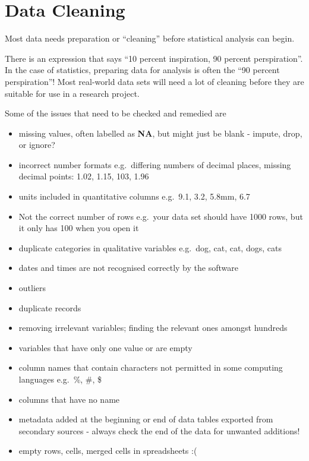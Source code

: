 \documentclass[
]{book}
\providecommand{\tightlist}{%
  \setlength{\itemsep}{0pt}\setlength{\parskip}{0pt}}
\begin{document}
\section{Data Cleaning}\label{data-cleaning}

Most data needs preparation or ``cleaning'' before statistical analysis can begin.

There is an expression that says ``10 percent inspiration, 90 percent perspiration''. In the case of statistics, preparing data for analysis is often the ``90 percent perspiration''! Most real-world data sets will need a lot of cleaning before they are suitable for use in a research project.

Some of the issues that need to be checked and remedied are

\begin{itemize}
\tightlist
\item
  missing values, often labelled as \textbf{NA}, but might just be blank - impute, drop, or ignore?
\item
  incorrect number formats e.g.~differing numbers of decimal places, missing decimal points: 1.02, 1.15, 103, 1.96
\item
  units included in quantitative columns e.g.~9.1, 3.2, 5.8mm, 6.7
\item
  Not the correct number of rows e.g.~your data set should have 1000 rows, but it only has 100 when you open it
\item
  duplicate categories in qualitative variables e.g.~dog, cat, cat, dogs, cats
\item
  dates and times are not recognised correctly by the software
\item
  outliers
\item
  duplicate records
\item
  removing irrelevant variables; finding the relevant ones amongst hundreds
\item
  variables that have only one value or are empty
\item
  column names that contain characters not permitted in some computing languages e.g.~\%, \#, \$
\item
  columns that have no name
\item
  metadata added at the beginning or end of data tables exported from secondary sources - always check the end of the data for unwanted additions!
\item
  empty rows, cells, merged cells in spreadsheets :(
\end{itemize}
\end{document}

